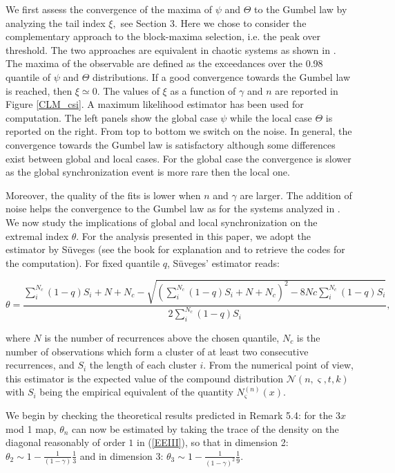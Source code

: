 \documentclass[12pt,reqno,a4paper]{amsart}
\begin{document}
We first assess the convergence of the  maxima of $\psi$ and $\Theta$ to the Gumbel law by analyzing the tail index $\xi,$ see Section 3.  Here we chose to consider the complementary approach to the block-maxima selection, i.e. the peak over threshold. The two approaches are equivalent in chaotic systems as shown in \cite{ERDS}. The maxima of the observable are defined as the exceedances over the 0.98 quantile of $\psi$ and $\Theta$ distributions. If a good convergence towards the Gumbel law is reached, then $\xi \simeq 0$. The values of $\xi$  as a function of $\gamma$ and $n$ are reported in Figure \ref{CLM_csi}. A maximum likelihood estimator has been used for computation. The left panels show the global case $\psi$ while the  local case  $\Theta$ is reported on the right. From top to bottom we switch on the noise.  In general, the convergence towards the Gumbel law is satisfactory although some differences exist between global and local cases. For the global case the convergence is slower as the global synchronization event  is more rare then the local one.

 Moreover, the quality of the fits is lower when $n$ and $\gamma$ are larger. The addition of noise helps the convergence to the Gumbel law as for the systems analyzed  in \cite{ERDS}.\\

We now study the implications of global and local synchronization  on the  extremal index $\theta$. For the analysis presented in this paper, we adopt the  estimator  by
S\"uveges (see the book \cite{ERDS} for explanation and to retrieve the codes for the computation). For fixed
quantile $q$, S\"uveges' estimator reads:

$$ \theta=\frac{\sum_{i}^{N_c} (1-q)S_i +N+N_c- \sqrt{ \left(\sum_{i}^{N_c} (1-q)S_i  +N+N_c\right)^2  -8Nc\sum_i^{N_c} (1-q) S_i  }}{2\sum_{i}^{N_c} (1-q) S_i },$$

where $N$ is the number of recurrences above the chosen quantile, $N_c$ is the number of observations which form a
cluster of at least two consecutive recurrences, and $S_i$ the length
of each cluster $i$. From the numerical point of view, this estimator is the expected value of the compound distribution $\mathcal{N}(n, \varsigma, t, k)$ with $S_i$ being the empirical equivalent of the quantity $N_{\varsigma}^{(n)}(x)$.

We begin by checking the theoretical results predicted in Remark 5.4: for the 3$x$ mod 1 map, $\theta_n$ can now be estimated by taking the trace of the density on the diagonal reasonably of order $1$  in (\ref{EEIII}), so that in dimension 2:
$
\theta_2\sim 1- \frac{1}{(1-\gamma)}\frac{1}{3}
$
and in dimension $3$:
$
\theta_3\sim 1- \frac{1}{(1-\gamma)^2}\frac{1}{9}.
$
\end{document}

